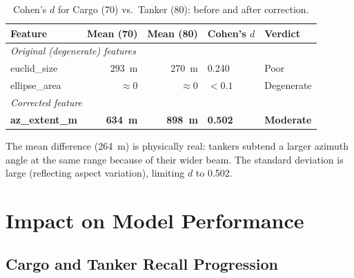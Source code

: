 \documentclass[journal]{IEEEtran}
\begin{document}
\begin{table}[H]
\centering
\caption{Cohen's $d$ for Cargo (70) vs.\ Tanker (80): before and after correction.}
\begin{tabular}{lrrll}
\toprule
\textbf{Feature} & \textbf{Mean (70)} & \textbf{Mean (80)} & \textbf{Cohen's $d$} & \textbf{Verdict} \\
\midrule
\multicolumn{5}{l}{\textit{Original (degenerate) features}} \\
euclid\_size         & 293~m & 270~m & 0.240 & Poor \\
ellipse\_area        & $\approx0$ & $\approx0$ & $<0.1$ & Degenerate \\
\midrule
\multicolumn{5}{l}{\textit{Corrected feature}} \\
\textbf{az\_extent\_m} & \textbf{634~m} & \textbf{898~m} & \textbf{0.502} & \textbf{Moderate} \\
\bottomrule
\end{tabular}
\end{table}

The mean difference (264~m) is physically real: tankers subtend a larger
azimuth angle at the same range because of their wider beam.
The standard deviation is large (reflecting aspect variation),
limiting $d$ to 0.502.

\section{Impact on Model Performance}
\label{sec:impact}

\subsection{Cargo and Tanker Recall Progression}
\end{document}
